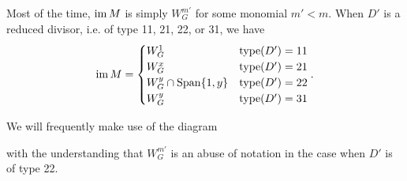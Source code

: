 Most of the time, $\operatorname{im} M$ is simply $W_G^{m'}$ for some monomial $m' < m$.
When $D'$ is a reduced divisor, i.e. of type 11, 21, 22, or 31, we have
\[
  \operatorname{im} M = \begin{cases}
    W_G^1 & \operatorname{type}(D') = 11 \\
    W_G^x & \operatorname{type}(D') = 21 \\
    W_G^y \cap \operatorname{Span}\{ 1, y \} & \operatorname{type}(D') = 22 \\
    W_G^y & \operatorname{type}(D') = 31
  \end{cases}.
\]

We will frequently make use of the diagram
\begin{center}
\end{center}
with the understanding that $W_G^{m'}$ is an abuse of notation in the case when $D'$ is of type 22.

